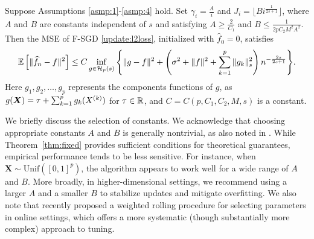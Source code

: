 \begin{theorem}\label{thm:fixed}
    Suppose Assumptions \ref{asmp:1}-\ref{asmp:4} hold.  Set $\gamma_i = \frac{A}{i}$ and $J_i = \lfloor Bi^{\frac{1}{2s+1}} \rfloor$, where $A$ and $B$ are constants independent of $ s $ and satisfying $A \geq \frac{2}{C_1}$ and $B \leq \frac{1}{2pC_2M^2A^2}$. Then the MSE of F-SGD \eqref{update:l2loss}, initialized with $\hat f_0 = 0$, satisfies
\begin{align*}
    \mathbb{E} \left[\| \widehat{f}_n - f\|^2 \right] \leq C\inf_{g\in \mathcal{H}_p(s)} \Bigg\{ \|g-f\|^2 + \left(\sigma^2+\|f\|^2+\sum_{k=1}^p\|g_k\|^2_s \right) n^{-\frac{2s}{2s+1}}\Bigg\}.
\end{align*}
Here $g_1,g_2,\dots,g_p$ represents the components functions of $g$, as $g(\bm{X}) = \tau + \sum_{k=1}^pg_k(X^{(k)})$ for $\tau \in \mathbb{R}$, and  $C = C(p,C_1,C_2,M,s)$ is a   constant.  
\end{theorem}

We briefly discuss the selection of constants. We acknowledge that choosing appropriate constants $A$ and $B$ is generally nontrivial, as also noted in \cite{zhang2022sieve,zhang2023online}. While Theorem~\ref{thm:fixed} provides sufficient conditions for theoretical guarantees, empirical performance tends to be less sensitive. For instance, when $\boldsymbol{X} \sim \mathrm{Unif}([0,1]^p)$, the algorithm appears to work well for a wide range of $A$ and $B$. More broadly, in higher-dimensional settings, we recommend using a larger $A$ and a smaller $B$ to stabilize updates and mitigate overfitting. We also note that \cite{zhang2023online} recently proposed a weighted rolling procedure for selecting parameters in online settings, which offers a more systematic (though substantially more complex) approach to tuning.




